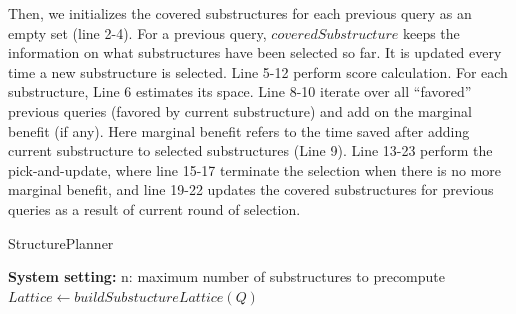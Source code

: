 Then, we initializes the covered substructures for each previous query as an empty set (line 2-4). For a previous query, $coveredSubstructure$ keeps the information on what substructures have been selected so far. %
It is updated every time a new substructure is selected. Line 5-12 perform score calculation. For each substructure, Line 6 estimates its space. Line 8-10 iterate over all ``favored'' previous queries (favored by current substructure) and add on the marginal benefit (if any). Here marginal benefit refers to the time saved after adding current substructure to selected substructures (Line 9). Line 13-23 perform the pick-and-update, where line 15-17 terminate the selection when there is no more marginal benefit, and line 19-22 updates the covered substructures for previous queries as a result of current round of selection.

\begin{algorithm}%
\label{alg:StructurePlanner}
\caption{StructurePlanner}
\LinesNumbered 
\textbf{System setting:} n: maximum number of substructures to precompute\\ 
$Lattice \leftarrow buildSubstuctureLattice(Q)$\;
\end{algorithm}

